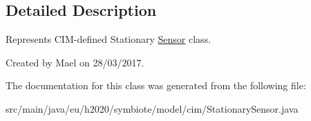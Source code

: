 \subsection{Detailed Description}
Represents C\+I\+M-\/defined Stationary \hyperlink{classeu_1_1h2020_1_1symbiote_1_1model_1_1cim_1_1Sensor}{Sensor} class.

Created by Mael on 28/03/2017. 

The documentation for this class was generated from the following file\+:\begin{DoxyCompactItemize}
\item 
src/main/java/eu/h2020/symbiote/model/cim/Stationary\+Sensor.\+java\end{DoxyCompactItemize}
